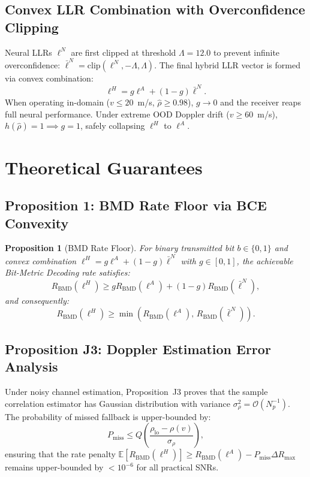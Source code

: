 \documentclass[journal,10pt,twocolumn]{IEEEtran}
\newtheorem{proposition}{Proposition}
\theoremstyle{definition}
\begin{document}
\subsection{Convex LLR Combination with Overconfidence Clipping}
Neural LLRs $\ell^N$ are first clipped at threshold $\Lambda = 12.0$ to prevent infinite overconfidence: $\bar{\ell}^N = \mathrm{clip}(\ell^N, -\Lambda, \Lambda)$. The final hybrid LLR vector is formed via convex combination:
\begin{equation}
    \ell^H = g \ell^A + (1 - g) \bar{\ell}^N.
\end{equation}
When operating in-domain ($v \le 20$~m/s, $\hat{\rho} \ge 0.98$), $g \to 0$ and the receiver reaps full neural performance. Under extreme OOD Doppler drift ($v \ge 60$~m/s), $h(\hat{\rho}) = 1 \implies g = 1$, safely collapsing $\ell^H$ to $\ell^A$.

\section{Theoretical Guarantees}
\subsection{Proposition 1: BMD Rate Floor via BCE Convexity}
\begin{proposition}[BMD Rate Floor]
For binary transmitted bit $b \in \{0, 1\}$ and convex combination $\ell^H = g \ell^A + (1 - g) \bar{\ell}^N$ with $g \in [0, 1]$, the achievable Bit-Metric Decoding rate satisfies:
\begin{equation}
    R_{\mathrm{BMD}}(\ell^H) \ge g R_{\mathrm{BMD}}(\ell^A) + (1 - g) R_{\mathrm{BMD}}(\bar{\ell}^N),
\end{equation}
and consequently:
\begin{equation}
    R_{\mathrm{BMD}}(\ell^H) \ge \min\left( R_{\mathrm{BMD}}(\ell^A), \, R_{\mathrm{BMD}}(\bar{\ell}^N) \right).
\end{equation}
\end{proposition}

\subsection{Proposition J3: Doppler Estimation Error Analysis}
Under noisy channel estimation, Proposition~J3 proves that the sample correlation estimator has Gaussian distribution with variance $\sigma_\rho^2 = \mathcal{O}(N_p^{-1})$. The probability of missed fallback is upper-bounded by:
\begin{equation}
    P_{\mathrm{miss}} \le Q\left( \frac{\rho_{\mathrm{lo}} - \rho(v)}{\sigma_\rho} \right),
\end{equation}
ensuring that the rate penalty $\mathbb{E}[R_{\mathrm{BMD}}(\ell^H)] \ge R_{\mathrm{BMD}}(\ell^A) - P_{\mathrm{miss}} \Delta R_{\mathrm{max}}$ remains upper-bounded by $< 10^{-6}$ for all practical SNRs.
\end{document}
